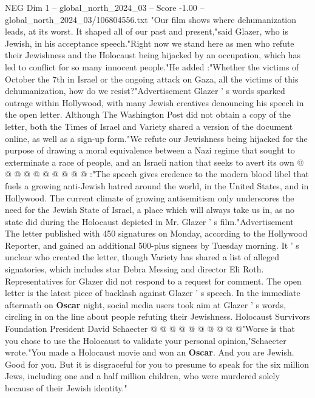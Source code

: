 \begin{textsample}{NEG Dim 1 – global\_north\_2024\_03 – Score -1.00 – global\_north\_2024\_03/106804556.txt}  \label{ex:f1_neg_076}
"Our film shows where dehumanization leads, at its worst.
It shaped all of our past and present,"said Glazer, who is Jewish, in his acceptance speech."Right now we stand here as men who refute their Jewishness and the Holocaust being hijacked by an occupation, which has led to conflict for so many innocent people."He added :"Whether the victims of October the 7th in Israel or the ongoing attack on Gaza, all the victims of this dehumanization, how do we resist?"Advertisement Glazer ' s words sparked outrage within Hollywood, with many Jewish creatives denouncing his speech in the open letter.
Although The Washington Post did not obtain a copy of the letter, both the Times of Israel and Variety shared a version of the document online, as well as a sign-up form."We refute our Jewishness being hijacked for the purpose of drawing a moral equivalence between a Nazi regime that sought to exterminate a race of people, and an Israeli nation that seeks to avert its own @ @ @ @ @ @ @ @ @ @ :"The speech gives credence to the modern blood libel that fuels a growing anti-Jewish hatred around the world, in the United States, and in Hollywood.
The current climate of growing antisemitism only underscores the need for the Jewish State of Israel, a place which will always take us in, as no state did during the Holocaust depicted in Mr.
Glazer ' s film."Advertisement The letter published with 450 signatures on Monday, according to the Hollywood Reporter, and gained an additional 500-plus signees by Tuesday morning.
It ' s unclear who created the letter, though Variety has shared a list of alleged signatories, which includes star Debra Messing and director Eli Roth.
Representatives for Glazer did not respond to a request for comment.
The open letter is the latest piece of backlash against Glazer ' s speech.
In the immediate aftermath on \textbf{Oscar} night, social media users took aim at Glazer ' s words, circling in on the line about people refuting their Jewishness.
Holocaust Survivors Foundation President David Schaecter @ @ @ @ @ @ @ @ @ @"Worse is that you chose to use the Holocaust to validate your personal opinion,"Schaecter wrote."You made a Holocaust movie and won an \textbf{Oscar}.
And you are Jewish.
Good for you.
But it is disgraceful for you to presume to speak for the six million Jews, including one and a half million children, who were murdered solely because of their Jewish identity."

\end{textsample}
